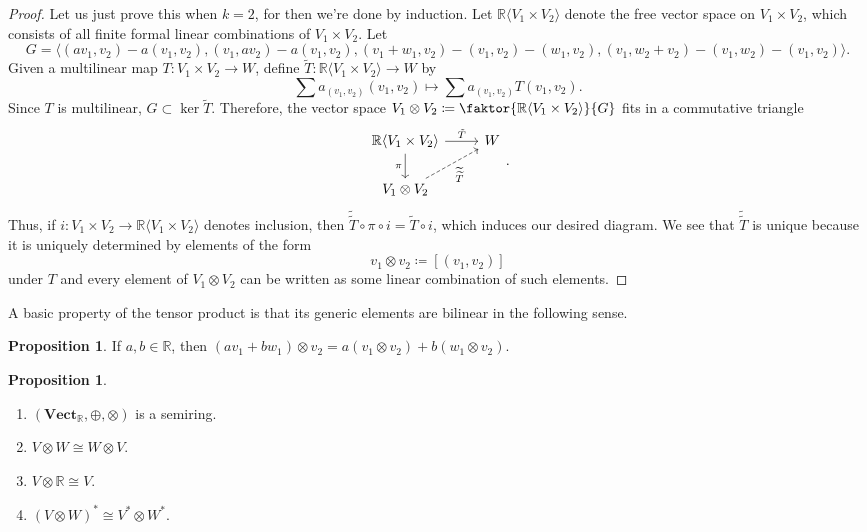 \documentclass[10pt,letterpaper,cm]{nupset}
\theoremstyle{definition}
\theoremstyle{theorem}
\newtheorem{prop}[definition]{Proposition}
\theoremstyle{remark}
\newcommand{\R}{\mathbb R}
\newcommand{\1}{\mathbf{1}}
\newcommand{\0}{\vec 0}
\begin{document}
\begin{proof}
Let us just prove this when $k=2$, for then we're done by induction. Let $\R\langle V_1 \times V_2 \rangle$ denote the free vector space on $V_1 \times V_2$, which consists of  all finite formal linear combinations of $V_1 \times V_2$. Let 
\[
G = \langle (av_1, v_2) - a(v_1, v_2), (v_1, av_2) - a(v_1, v_2), (v_1 + w_1, v_2) - (v_1, v_2)-(w_1, v_2), (v_1, w_2 + v_2) - (v_1, w_2) -(v_1, v_2)\rangle.
\]
Given a  multilinear map $T: V_1 \times V_2 \to W$, define $\widetilde{T} : \R\langle V_1 \times V_2\rangle \to W$ by $$\sum a_{(v_1, v_2)}(v_1, v_2) \mapsto \sum a_{(v_1, v_2)} T(v_1, v_2).$$ Since $T$ is multilinear, $G \subset \ker \widetilde{T}$. Therefore,  the vector space $V_1 \otimes V_2 \coloneqq  \faktor{\R\langle V_1 \times V_2 \rangle}{G}$ fits in a commutative triangle 
\[
\begin{tikzcd}
\R\langle V_1 \times V_2 \rangle \arrow[d, "\pi"'] \arrow[r, "\tilde{T}"] & W \\
V_1 \otimes V_2 \arrow[ru, "\widetilde{\widetilde{T}}"', dashed] & 
\end{tikzcd}.
\]
Thus, if $i: V_1 \times V_2 \to \R\langle V_1 \times V_2 \rangle$ denotes inclusion, then $\widetilde{\widetilde{T}} \circ \pi \circ i = \widetilde{T} \circ i$, which induces our desired diagram. We see that $\widetilde{\widetilde{T}}$ is unique because it is uniquely determined by elements of the form $$v_1 \otimes v_2\coloneqq \left[(v_1, v_2)\right]$$ under $T$ and every element of $V_1 \otimes V_2$ can be written as some linear combination of such elements.
\end{proof}

\smallskip

A basic property of the tensor product is that its generic elements are bilinear in the following sense.

\begin{prop}
If $a,b \in \R$, then $(av_1 + bw_1) \otimes v_2 = a(v_1 \otimes v_2) + b(w_1 \otimes v_2)$.
\end{prop}

\begin{prop} $ $
\begin{enumerate}
\item $\left(\mathbf{Vect}_{\R}, \oplus, \otimes\right)$ is a semiring. 
\item $V \otimes W \cong W \otimes V$.
\item $V \otimes \R \cong V$.
\item $\left(V \otimes W\right)^{\ast} \cong V^{\ast} \otimes W^{\ast}$.
\end{enumerate}
\end{prop}
\end{document}
